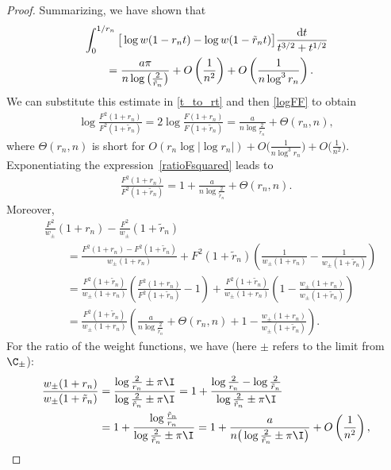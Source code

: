 \begin{proof}
Summarizing, we have shown that
\begin{align*}
& \int_0^{1/r_n} \big[\log w(1-r_n t)- \log w(1-\tilde r_n t)\big] \frac{{\rm d}t}{t^{3/2}+t^{1/2}}
 \\
 &\qquad= \frac{a\pi}{n\log \big(\frac{2}{\tilde r_n }\big)} + O\left(\frac{1}{n^2}\right) + O\left(\frac{1}{n \log^3 r_n} \right).
\end{align*}
We can substitute this estimate in \eqref{t_to_rt} and then \eqref{logFF} to obtain
\begin{align}\label{ratioFsquared}
 \log\frac{F^2(1+r_n)}{F^2(1+\tilde r_n)} = 2 \log \frac{F(1+r_n)}{F(1+\tilde r_n)} = \frac{a}{ n\log \frac{2}{\tilde r_n} } + \Theta(r_n, n),
\end{align}
where $\Theta(r_n, n)$ is short for $O(r_n \log |\log r_n|) + O\big(\frac{1}{n\log^3 r_n}\big) +O\big(\frac{1}{n^2}\big)$. Exponentiating the expression~\eqref{ratioFsquared} leads to
\begin{align*}
 \frac{F^2(1+r_n)}{F^2(1+\tilde r_n)} = 1 + \frac{a}{ n\log \frac{2}{\tilde r_n} } + \Theta(r_n, n).
\end{align*}
Moreover,
\begin{align}
& \frac{F^2}{w_\pm}(1+r_n) - \frac{F^2}{w_\pm}(1+\tilde r_n)
\nonumber \\
 &\qquad = \frac{F^2(1+r_n)-F^2(1+\tilde r_n)}{w_\pm(1+r_n)} + F^2(1+\tilde r_n)\left(\frac{1}{w_\pm(1+r_n)}-\frac{1}{w_\pm(1+\tilde r_n)}\right)
\nonumber \\
 &\qquad = \frac{F^2(1+\tilde r_n)}{w_\pm(1+r_n)}\left(\frac{F^2(1+r_n)}{F^2(1+\tilde r_n)}-1\right) + \frac{F^2(1+\tilde r_n)}{w_\pm(1+r_n)}\left(1-\frac{w_\pm(1+r_n)}{w_\pm(1+\tilde r_n)}\right)
\nonumber \\
 &\qquad = \frac{F^2(1+\tilde r_n)}{w_\pm(1+r_n)}\left(\frac{a}{n\log \frac{2}{\tilde r_n}} + \Theta(r_n, n)+ 1-\frac{w_\pm(1+r_n)}{w_\pm(1+\tilde r_n)}\right).\label{FTheta}
\end{align}
For the ratio of the weight functions, we have (here $\pm$ refers to the limit from $\C_\pm$):
\begin{align*}
 \frac{w_\pm(1+r_n)}{w_\pm(1+\tilde r_n)} &= \frac{\log \frac{2}{r_n}\pm \pi \I}{\log \frac{2}{\tilde r_n}\pm \pi \I} = 1 + \frac{\log \frac{2}{r_n}-\log\frac{2}{\tilde r_n}}{\log \frac{2}{\tilde r_n}\pm \pi \I}
 \\
 &= 1+ \frac{\log \frac{\tilde r_n}{r_n}}{\log \frac{2}{\tilde r_n}\pm \pi \I} = 1 + \frac{a}{n\big(\log \frac{2}{\tilde r_n}\pm \pi \I\big)}+ O\left(\frac{1}{n^2}\right),
\end{align*}

\end{proof}
